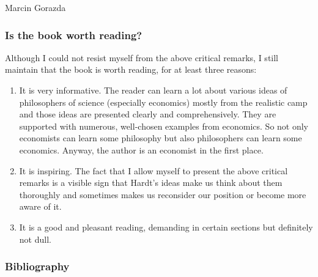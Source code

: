 \begin{recengenv}{Marcin Gorazda}
\subsubsection{Is the book worth reading? }
Although I could not resist myself from the above critical remarks, I still maintain that the book is worth reading, for
at least three reasons:

\begin{enumerate}
\item It is very informative. The reader can learn a lot about various ideas of philosophers of science (especially
economics) mostly from the realistic camp and those ideas are presented clearly and comprehensively. They are supported
with numerous, well-chosen examples from economics. So not only economists can learn some philosophy but also
philosophers can learn some economics. Anyway, the author is an economist in the first place. 
\item It is inspiring. The fact that I allow myself to present the above critical remarks is a visible sign that Hardt’s
ideas make us think about them thoroughly and sometimes makes us reconsider our position or become more aware of it. 
\item It is a good and pleasant reading, demanding in certain sections but definitely not dull. 
\end{enumerate}



\subsubsection{Bibliography}\nopagebreak[4]
\end{recengenv}
